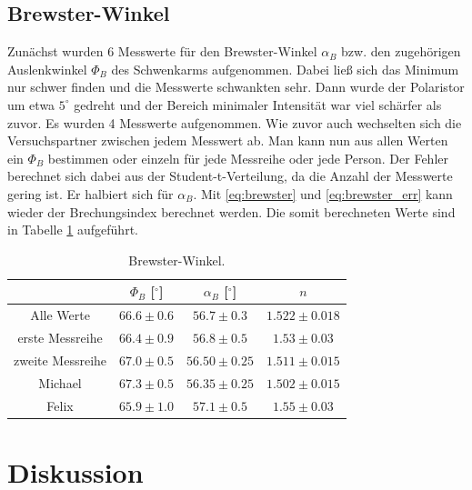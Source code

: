 \documentclass[12pt,a4paper,titlepage,headinclude,bibtotoc]{scrartcl}
\begin{document}
\subsection{Brewster-Winkel}
Zunächst wurden 6 Messwerte für den Brewster-Winkel $\alpha_B$ bzw. den zugehörigen Auslenkwinkel $\Phi_B$ des Schwenkarms aufgenommen.
Dabei ließ sich das Minimum nur schwer finden und die Messwerte schwankten sehr.
Dann wurde der Polaristor um etwa $5^\circ$ gedreht und der Bereich minimaler Intensität war viel schärfer als zuvor.
Es wurden 4 Messwerte aufgenommen.
Wie zuvor auch wechselten sich die Versuchspartner zwischen jedem Messwert ab.
Man kann nun aus allen Werten ein $\Phi_B$ bestimmen oder einzeln für jede Messreihe oder jede Person.
Der Fehler berechnet sich dabei aus der Student-t-Verteilung, da die Anzahl der Messwerte gering ist.
Er halbiert sich für $\alpha_B$.
Mit \eqref{eq:brewster} und \eqref{eq:brewster_err} kann wieder der Brechungsindex berechnet werden.
Die somit berechneten Werte sind in Tabelle \ref{tab:brewster} aufgeführt.
\begin{table}[!htb]
	\centering
	\begin{tabular}{|c|c|c|c|}
		\hline		
		& $\Phi_B$ [$^\circ$] & $\alpha_B$ [$^\circ$] & $n$ \\
		\hline
		Alle Werte & $66.6 \pm 0.6$ & $56.7 \pm 0.3$ & $1.522 \pm 0.018$ \\
		erste Messreihe & $66.4 \pm 0.9$ & $56.8 \pm 0.5$ & $1.53 \pm 0.03$ \\
		zweite Messreihe & $67.0 \pm 0.5$ & $56.50 \pm 0.25$ & $1.511 \pm 0.015$ \\
		\hline
		Michael & $67.3 \pm 0.5$ & $56.35 \pm 0.25$ & $1.502 \pm 0.015$ \\
		Felix & $65.9 \pm 1.0$ & $57.1 \pm 0.5$ & $1.55 \pm 0.03$ \\
		\hline
	\end{tabular}
	\caption{Brewster-Winkel.}
	\label{tab:brewster}
\end{table}

\section{Diskussion}
\label{sec:diskussion}
\end{document}
